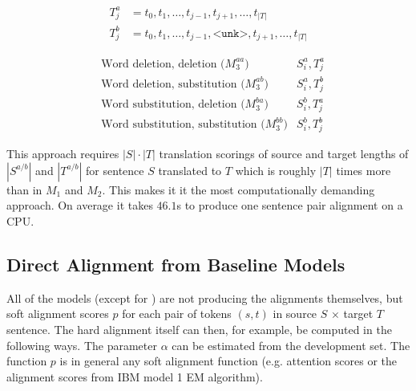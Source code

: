 \vspace{-0.8cm}

\begin{align*}
    T^a_j &= t_0, t_1, \ldots, t_{j-1}, t_{j+1}, \ldots, t_{|T|} \\
    T^b_j &= t_0, t_1, \ldots, t_{j-1}, \texttt{<unk>}, t_{j+1}, \ldots, t_{|T|}
\end{align*}

\vspace{-0.8cm}

\begin{align*}
    & \text{Word deletion, deletion ($M_3^{aa}$)} & S^a_i, T^a_j \\
    & \text{Word deletion, substitution ($M_3^{ab}$)} & S^a_i, T^b_j \\
    & \text{Word substitution, deletion ($M_3^{ba}$)} & S^b_i, T^a_j \\  
    & \text{Word substitution, substitution ($M_3^{bb}$)} & S^b_i, T^b_j
\end{align*}

This approach requires $|S|\cdot|T|$ translation scorings of source and target lengths of $|S^{a/b}|$ and $|T^{a/b}|$ for sentence $S$ translated to $T$ which is roughly $|T|$ times more than in $M_1$ and $M_2$. This makes it it the most computationally demanding approach. On average it takes $46.1$s to produce one sentence pair alignment on a CPU.

\subsection{Direct Alignment from Baseline Models} \label{subsec:extractors}

All of the models (except for \fastalign{}) are not producing the alignments themselves, but soft alignment scores $p$ for each pair of tokens $(s, t)$ in source $S$ $\times$ target $T$ sentence. The hard alignment itself can then, for example, be computed in the following ways. The parameter $\alpha$ can be estimated from the development set. The function $p$ is in general any soft alignment function (e.g. attention scores or the alignment scores from IBM model 1 EM algorithm).

